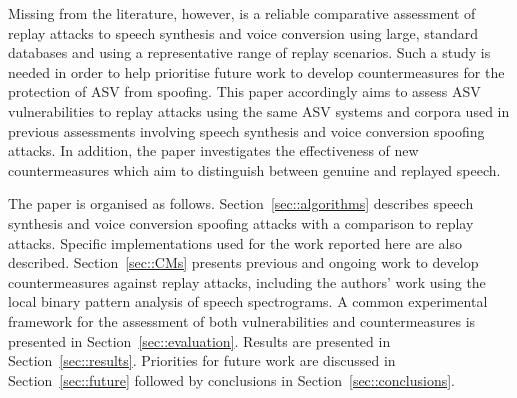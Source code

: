 
Missing from the literature, however, is a reliable comparative assessment 
of replay attacks to speech synthesis and voice conversion using large, 
standard databases and using a representative range of replay scenarios. 
Such a study is needed in order to help prioritise future work to develop
countermeasures for the protection of ASV from spoofing.
This paper accordingly aims to assess ASV vulnerabilities 
to replay attacks using the same ASV systems and corpora used in 
previous assessments involving speech synthesis and voice conversion  
spoofing attacks.  In addition, the paper investigates the effectiveness of 
new countermeasures which aim to distinguish between genuine and replayed speech.  

The paper is organised as follows.  Section~\ref{sec::algorithms} describes speech synthesis and voice conversion spoofing attacks with a comparison to replay attacks. Specific implementations used for the work reported here are also described. Section~\ref{sec::CMs} presents previous and ongoing work to develop countermeasures against replay attacks, including the authors' work using the local binary pattern analysis of speech spectrograms.  A common experimental framework for the assessment of both vulnerabilities and countermeasures is presented in Section~\ref{sec::evaluation}. Results are presented in Section~\ref{sec::results}.  Priorities for future work are discussed in Section~\ref{sec::future} followed by conclusions in Section~\ref{sec::conclusions}.
